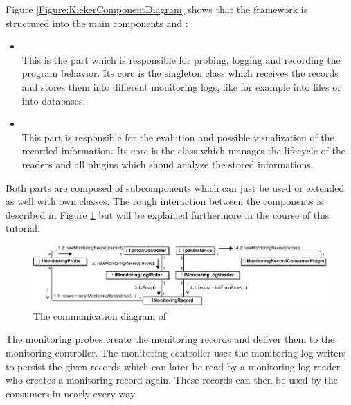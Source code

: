 \noindent Figure \ref{Figure:KiekerComponentDiagram} shows that the framework is structured %
into the main components \KiekerMonitoringPart{} and \KiekerAnalysisPart{}:
\begin{itemize}
\item \KiekerMonitoringPart\\
This is the part which is responsible for probing, logging and recording the program behavior. Its core is the singleton class  \notify which receives the records and stores them into different monitoring logs, like for example into files or into databases.
\item \KiekerAnalysisPart\\
This part is responsible for the evalution and possible visualization of the recorded information. Its core is the class  \notify which manages the lifecycle of the readers and all plugins which shoud analyze the stored informations.
\end{itemize}

\noindent Both parts are composed of subcomponents which can just be used or extended as well with own classes. The rough interaction between the components is described in Figure \ref{Figure:KiekerCommunicationDiagram} but will be explained furthermore in the course of this tutorial.

		\begin{figure}[H]\centering
				\includegraphics[width=1\textwidth]{images/kiekerCommunications-revisedReArranged-woMonitoringLog-bw}
			\caption{The communication diagram of \Kieker}
			\label{Figure:KiekerCommunicationDiagram}
		\end{figure}
		
		\notify The monitoring probes create the monitoring records and deliver them to the monitoring controller. The monitoring controller uses the monitoring log writers to persist the given records which can later be read by a monitoring log reader who creates a monitoring record again. These records can then be used by the consumers in nearly every way.

